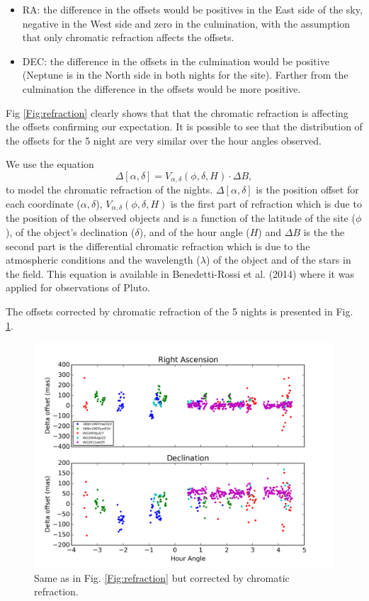 \documentclass[12pt,a4paper]{report}
\begin{document}
\begin{itemize}
\item RA: the difference in the offsets would be positives in the East side of the sky, negative in the West side and zero in the culmination, with the assumption that only chromatic refraction affects the offsets.
\item DEC: the difference in the offsets in the culmination would be positive (Neptune is in the North side in both nights for the site). Farther from the culmination the difference in the offsets would be more positive.
\end{itemize}

Fig \ref{Fig:refraction} clearly shows that that the chromatic refraction is affecting the offsets confirming our expectation. It is possible to see that the distribution of the offsets for the 5 night are very similar over the hour angles observed.

We use the equation \:
\begin{equation}
\Delta [\alpha, \delta] = V_{\alpha,\delta} (\phi,\delta, H) \cdot \Delta B,
\label{Eq:refraction}
\end{equation}
to model the chromatic refraction of the nights. $\Delta [\alpha, \delta]$ is the position offset for each coordinate ($\alpha, \delta$), $V_{\alpha,\delta} (\phi,\delta, H)$ is the first part of refraction which is due to the position of the observed objects and is a function of the latitude of the site ($\phi$), of the object’s declination ($\delta$), and of the hour angle ($H$) and $\Delta B$ is the the second part is the differential chromatic refraction which is due to the atmospheric conditions and the wavelength ($\lambda$) of the object and of the stars in the field. This equation is available in Benedetti-Rossi et al. (2014) where it was applied for observations of Pluto.

The offsets corrected by chromatic refraction of the 5 nights is presented in Fig. \ref{Fig:refraction-cor}.

\begin{figure}[h]
\includegraphics[width=16.0cm]{plot_hour_dif_cor.png} 
\caption{Same as in Fig. \ref{Fig:refraction} but corrected by chromatic refraction.}
\label{Fig:refraction-cor}
\end{figure}
\end{document}
